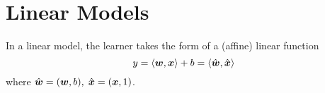 \section{Linear Models}
In a linear model, the learner takes the form of a (affine) linear function
$$y = \langle\boldsymbol{w}, \boldsymbol{x}\rangle + b = \langle\hat{\boldsymbol{w}}, \hat{\boldsymbol{x}}\rangle$$
where $\hat{\boldsymbol{w}}=(\boldsymbol{w}, b),\;\hat{\boldsymbol{x}} = (\boldsymbol{x}, 1)$.
